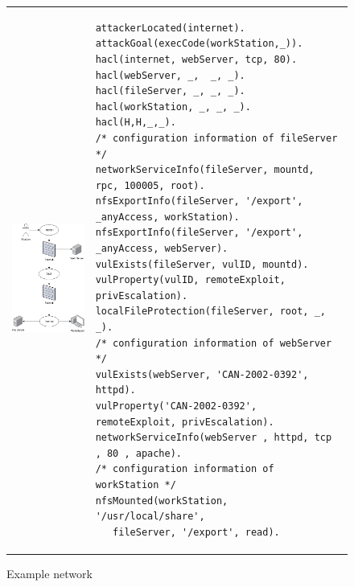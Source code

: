 \begin{figure}[ht]
\begin{tabular}{p{}p{}}
\begin{minipage}{.43\textwidth}
\centering
\includegraphics[scale=.47]{resource/img/ch_background/sdn_analytics/egarch_01.png}
\caption{Example network}
\label{fig:eg_net01}
\end{minipage}
&
\begin{minipage}{.51\textwidth}
\begin{lstlisting}[style=datalog, label={lst:input}, caption={input.P \cite{Ou_Boyer_McQueen_2006}}]
attackerLocated(internet).
attackGoal(execCode(workStation,_)).
hacl(internet, webServer, tcp, 80).
hacl(webServer, _,  _, _).
hacl(fileServer, _, _, _).
hacl(workStation, _, _, _).
hacl(H,H,_,_).
/* configuration information of fileServer */
networkServiceInfo(fileServer, mountd, rpc, 100005, root).
nfsExportInfo(fileServer, '/export', _anyAccess, workStation).
nfsExportInfo(fileServer, '/export', _anyAccess, webServer).
vulExists(fileServer, vulID, mountd).
vulProperty(vulID, remoteExploit, privEscalation).
localFileProtection(fileServer, root, _, _).
/* configuration information of webServer */
vulExists(webServer, 'CAN-2002-0392', httpd).
vulProperty('CAN-2002-0392', remoteExploit, privEscalation).
networkServiceInfo(webServer , httpd, tcp , 80 , apache).
/* configuration information of workStation */
nfsMounted(workStation, '/usr/local/share', 
   fileServer, '/export', read).
\end{lstlisting}
\end{minipage}
\end{tabular}
\end{figure}

